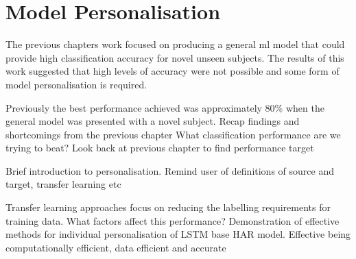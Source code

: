 \chapter{Model Personalisation}
\label{chp:personalisation}
The previous chapters work focused on producing a general \acrshort{ml} model that could provide high classification accuracy for novel unseen subjects. The results of this work suggested that high levels of accuracy were not possible and some form of model personalisation is required.


Previously the best performance achieved was approximately 80\% when the general model was presented with a novel subject.
Recap findings and shortcomings from the previous chapter
What classification performance are we trying to beat? Look back at previous chapter to find performance target
 
 Brief introduction to personalisation. Remind user of definitions of source and target, transfer learning etc



Transfer learning approaches focus on reducing the labelling requirements for training data.
What factors affect this performance?
Demonstration of effective methods for individual personalisation of LSTM base HAR model. Effective being computationally efficient, data efficient and accurate





